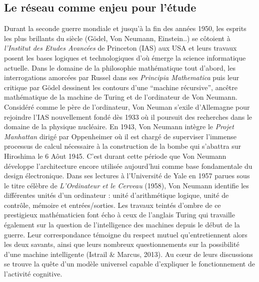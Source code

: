 \subsection[Le r\'eseau comme enjeu pour l{\textquoteright}\'etude]{Le r\'eseau comme enjeu pour l{\textquoteright}\'etude}
Durant la seconde guerre mondiale et jusqu{\textquoteright}\`a la fin
des ann\'ees 1950, les esprits les plus brillants du si\`ecle (G\"odel,
Von Neumann, Einstein..) se c\^otoient \`a
\textit{l{\textquoteright}Institut des Etudes Avanc\'ees} de Princeton
(IAS) aux USA et leurs travaux posent les bases logiques et
technologiques d{\textquoteright}o\`u \'emerge la science informatique
actuelle. Dans le domaine de la philosophie math\'ematique tout
d{\textquoteright}abord, les interrogations amorc\'ees par Russel dans
ses \textit{Principia Mathematica }puis leur critique par G\"odel
dessinent les contours d{\textquoteright}une {\textquotedblleft}machine
r\'ecursive{\textquotedblright}, anc\^etre math\'ematique de la machine
de Turing et de l{\textquoteright}ordinateur de Von Neumann.
Consid\'er\'e comme le p\`ere de l{\textquoteright}ordinateur, Von
Neuman s{\textquoteright}exile d{\textquoteright}Allemagne pour
rejoindre l{\textquoteright}IAS nouvellement fond\'e d\`es 1933 o\`u il
poursuit des recherches dans le domaine de la physique nucl\'eaire. En
1943, Von Neumann int\`egre le \textit{Projet Manhattan} dirig\'e par
Oppenheimer o\`u il est charg\'e de superviser
l{\textquoteright}immense processus de calcul n\'ecessaire \`a la
construction de la bombe qui s{\textquoteright}abattra sur Hiroshima le
6 A\^out 1945. C{\textquoteright}est durant cette p\'eriode que Von
Neumann d\'eveloppe l{\textquoteright}architecture encore utilis\'ee
aujourd{\textquoteright}hui comme base fondamentale du design
\'electronique. Dans ses lectures \`a l{\textquoteright}Universit\'e de
Yale en 1957 parues sous le titre c\'el\`ebre de
\textit{L{\textquoteright}Ordinateur et le Cerveau }(1958), Von Neumann
identifie les diff\'erentes unit\'es d{\textquoteright}un ordinateur :
unit\'e d{\textquoteright}arithm\'etique logique, unit\'e de
contr\^ole, m\'emoire et entr\'ees/sorties. Les travaux teint\'es
d{\textquoteright}ombre de ce prestigieux math\'ematicien font \'echo
\`a ceux de l{\textquoteright}anglais Turing qui travaille \'egalement
sur la question de l{\textquoteright}intelligence des machines depuis
le d\'ebut de la guerre. Leur correspondance t\'emoigne du respect
mutuel qu{\textquoteright}entretiennent alors les deux savants, ainsi
que leurs nombreux questionnements sur la possibilit\'e
d{\textquoteright}une machine intelligente (Istrail \& Marcus, 2013).
Au c{\oe}ur de leurs discussions se trouve la qu\^ete
d{\textquoteright}un mod\`ele universel capable
d{\textquoteright}expliquer le fonctionnement de
l{\textquoteright}activit\'e cognitive. 

